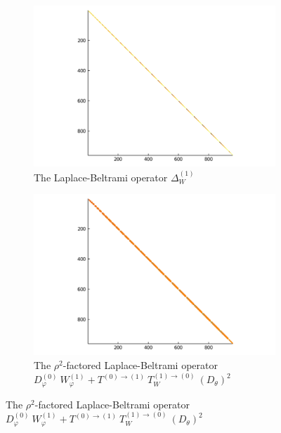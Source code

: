 \documentclass[11pt, oneside]{article}   	%
\begin{document}
\begin{figure}[t]
	\centering %
	\begin{subfigure}{0.45\textwidth}
		\includegraphics[scale=0.3]{sparsity-of-laplacian}
		\centering
		\caption{The Laplace-Beltrami operator $\Delta^{(1)}_W$}
	\end{subfigure}\hfil %
	\begin{subfigure}{0.45\textwidth}
		\includegraphics[scale=0.3]{sparsity-of-rho2laplacian}
		\centering
		\caption{The $\rho^2$-factored Laplace-Beltrami operator $D_\varphi^{(0)} \: W_\varphi^{(1)} + T^{(0)\to(1)} \: T_W^{(1)\to(0)} \: (D_\theta)^2$}
	\end{subfigure}\hfil %


\end{figure}
\end{document}
